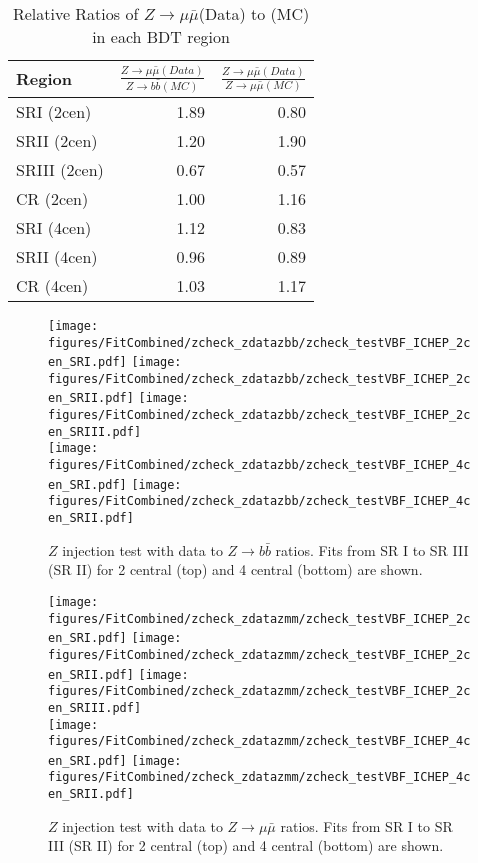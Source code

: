 \begin{table}[]
\centering
\caption{Relative Ratios of $Z\rightarrow \mu \bar \mu$(Data) to \zjets{}(MC) in each BDT region}
\label{tab:z_ratios}
\begin{tabular}{|l|r|r|}
\hline
Region       & $\frac{Z\rightarrow \mu \bar \mu(Data)}{Z\rightarrow b \bar b(MC)}$  &  $\frac{Z\rightarrow \mu \bar \mu(Data)}{Z\rightarrow \mu \bar \mu(MC)}$ \\ \hline
SRI (2cen)   & 1.89   & 0.80 \\ \hline
SRII (2cen)  & 1.20   & 1.90 \\ \hline
SRIII (2cen) & 0.67   & 0.57 \\ \hline
CR (2cen)    & 1.00   & 1.16 \\ \hline
SRI (4cen)   & 1.12   & 0.83 \\ \hline
SRII (4cen)  & 0.96   & 0.89 \\ \hline
CR (4cen)    & 1.03   & 1.17 \\ \hline

\end{tabular}
\end{table}

\begin{figure}[htbp]
  \centering
 \texttt{[image: figures/FitCombined/zcheck\_zdatazbb/zcheck\_testVBF\_ICHEP\_2cen\_SRI.pdf]}
 \texttt{[image: figures/FitCombined/zcheck\_zdatazbb/zcheck\_testVBF\_ICHEP\_2cen\_SRII.pdf]}
 \texttt{[image: figures/FitCombined/zcheck\_zdatazbb/zcheck\_testVBF\_ICHEP\_2cen\_SRIII.pdf]}\\
 \texttt{[image: figures/FitCombined/zcheck\_zdatazbb/zcheck\_testVBF\_ICHEP\_4cen\_SRI.pdf]}
 \texttt{[image: figures/FitCombined/zcheck\_zdatazbb/zcheck\_testVBF\_ICHEP\_4cen\_SRII.pdf]}\\

\caption{$Z$ injection test with data to $Z\rightarrow b \bar b$ ratios. Fits from SR I to SR III (SR II) for 2 central (top) and 4 central (bottom) are shown.}
  \label{fig:Fit_combined_zbb}
\end{figure}


\begin{figure}[htbp]
  \centering
 \texttt{[image: figures/FitCombined/zcheck\_zdatazmm/zcheck\_testVBF\_ICHEP\_2cen\_SRI.pdf]}
 \texttt{[image: figures/FitCombined/zcheck\_zdatazmm/zcheck\_testVBF\_ICHEP\_2cen\_SRII.pdf]}
 \texttt{[image: figures/FitCombined/zcheck\_zdatazmm/zcheck\_testVBF\_ICHEP\_2cen\_SRIII.pdf]}\\
 \texttt{[image: figures/FitCombined/zcheck\_zdatazmm/zcheck\_testVBF\_ICHEP\_4cen\_SRI.pdf]}
 \texttt{[image: figures/FitCombined/zcheck\_zdatazmm/zcheck\_testVBF\_ICHEP\_4cen\_SRII.pdf]}\\

\caption{$Z$ injection test with data to $Z\rightarrow \mu \bar \mu$ ratios. Fits from SR I to SR III (SR II) for 2 central (top) and 4 central (bottom) are shown.}
  \label{fig:Fit_combined_zmm}
\end{figure}

